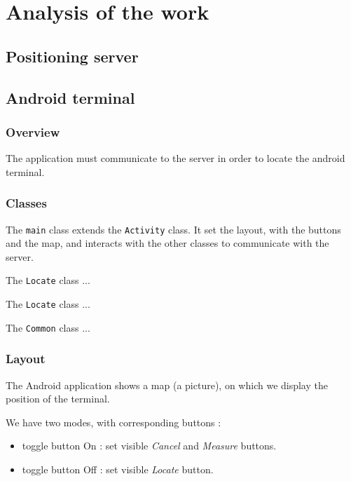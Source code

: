 \section{Analysis of the work}

\subsection{Positioning server}

\subsection{Android terminal}

\subsubsection{Overview}

The application must communicate to the server in order to locate the android
terminal. 

\subsubsection{Classes}

The \verb+main+ class extends the \verb+Activity+ class. It set the layout, with
the buttons and the map, and interacts with the other classes to communicate
with the server.

The \verb+Locate+ class ...

The \verb+Locate+ class ...

The \verb+Common+ class ...

\subsubsection{Layout}

The Android application shows a map (a picture), on which we display the
position of the terminal.

We have two modes, with corresponding buttons :

\begin{itemize}
    \item toggle button On : set visible \textit{Cancel} and \textit{Measure}
        buttons.
    \item toggle button Off : set visible \textit{Locate} button.
\end{itemize}

